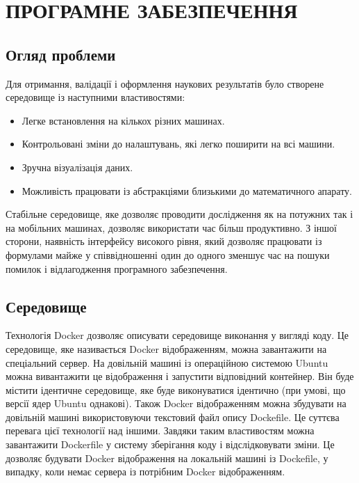 \chapter{ПРОГРАМНЕ ЗАБЕЗПЕЧЕННЯ}

\nocite{bahvalov-et-al,benerdge-et-al} 

\section{Огляд проблеми}

Для отримання, валідації і оформлення наукових результатів було створене середовище із наступними властивостями:
\begin{itemize}
    \item Легке встановлення на кількох різних машинах.
    \item Контрольовані зміни до налаштувань, які легко поширити на всі машини.
    \item Зручна візуалізація даних.
    \item Можливість працювати із абстракціями близькими до математичного апарату.
\end{itemize}

\noindent Стабільне середовище, яке дозволяє проводити дослідження як на потужних так і на мобільних машинах, дозволяє 
використати час більш продуктивно. З іншої сторони, наявність інтерфейсу високого рівня, який дозволяє працювати із 
формулами майже у співвідношенні один до одного зменшує час на пошуки помилок і відлагодження програмного забезпечення. 

\section{Середовище}

Технологія Docker дозволяє описувати середовище виконання у вигляді коду. Це середовище, яке називається Docker 
відображенням, можна завантажити на спеціальний сервер. На довільній машині із операційною системою Ubuntu можна 
вивантажити це відображення і запустити відповідний контейнер. Він буде містити ідентичне середовище, яке буде 
виконуватися ідентично (при умові, що версії ядер Ubuntu однакові). Також Docker відображенням можна збудувати на 
довільній машині використовуючи текстовий файл опису Dockefile. Це суттєва перевага цієї технології над іншими. Завдяки
таким властивостям можна завантажити Dockerfile у систему зберігання коду і відслідковувати зміни. Це дозволяє будувати
Docker відображення на локальній машині із Dockefile, у випадку, коли немає сервера із потрібним Docker відображенням.

